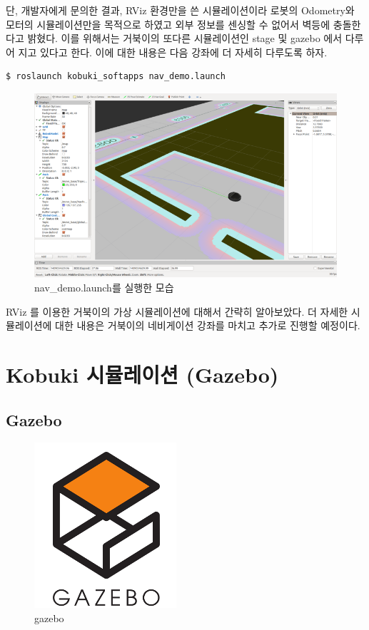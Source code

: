 단, 개발자에게 문의한 결과, RViz 환경만을 쓴 시뮬레이션이라 로봇의 Odometry와 모터의 시뮬레이션만을 목적으로 하였고 외부 정보를 센싱할 수 없어서 벽등에 충돌한다고 밝혔다. 이를 위해서는 거북이의 또다른 시뮬레이션인 stage 및 gazebo 에서 다루어 지고 있다고 한다. 이에 대한 내용은 다음 강좌에 더 자세히 다루도록 하자.

\vspace{\baselineskip}
\begin{lstlisting}[language=ROS]
$ roslaunch kobuki_softapps nav_demo.launch
\end{lstlisting}

\begin{figure}[h]
\centering\includegraphics[width=0.5\columnwidth]{pictures/chapter10/nav_demo.png}
\caption{nav\_demo.launch를 실행한 모습}
\end{figure}

RViz 를 이용한 거북이의 가상 시뮬레이션에 대해서 간략히 알아보았다. 더 자세한 시뮬레이션에 대한 내용은 거북이의 네비게이션 강좌를 마치고 추가로 진행할 예정이다.

\section{Kobuki 시뮬레이션 (Gazebo)}

\subsection{Gazebo}

\begin{figure}[h]
\centering\includegraphics[width=0.3\columnwidth]{pictures/chapter10/gazebo.png}
\caption{gazebo}
\end{figure}

